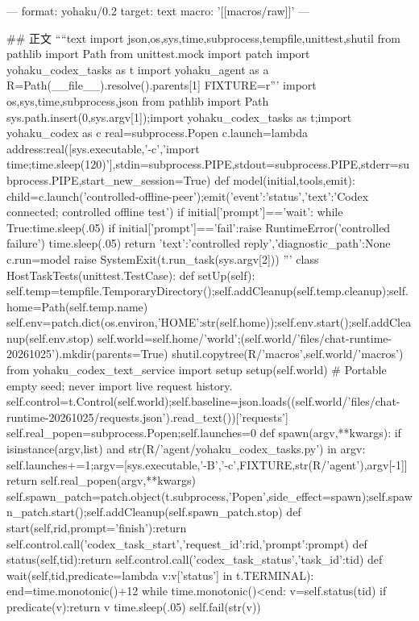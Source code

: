 ---
format: yohaku/0.2
target: text
macro: '[[macros/raw]]'
---

## 正文
````text
import json,os,sys,time,subprocess,tempfile,unittest,shutil
from pathlib import Path
from unittest.mock import patch
import yohaku_codex_tasks as t
import yohaku_agent as a
R=Path(__file__).resolve().parents[1]
FIXTURE=r'''
import os,sys,time,subprocess,json
from pathlib import Path
sys.path.insert(0,sys.argv[1]);import yohaku_codex_tasks as t;import yohaku_codex as c
real=subprocess.Popen
c.launch=lambda address:real([sys.executable,'-c','import time;time.sleep(120)'],stdin=subprocess.PIPE,stdout=subprocess.PIPE,stderr=subprocess.PIPE,start_new_session=True)
def model(initial,tools,emit):
 child=c.launch('controlled-offline-peer');emit({'event':'status','text':'Codex connected; controlled offline test'})
 if initial['prompt']=='wait':
  while True:time.sleep(.05)
 if initial['prompt']=='fail':raise RuntimeError('controlled failure')
 time.sleep(.05)
 return {'text':'controlled reply','diagnostic_path':None}
c.run=model
raise SystemExit(t.run_task(sys.argv[2]))
'''
class HostTaskTests(unittest.TestCase):
 def setUp(self):
  self.temp=tempfile.TemporaryDirectory();self.addCleanup(self.temp.cleanup);self.home=Path(self.temp.name)
  self.env=patch.dict(os.environ,{'HOME':str(self.home)});self.env.start();self.addCleanup(self.env.stop)
  self.world=self.home/'world';(self.world/'files/chat-runtime-20261025').mkdir(parents=True)
  shutil.copytree(R/'macros',self.world/'macros')
  from yohaku_codex_text_service import setup
  setup(self.world)  # Portable empty seed; never import live request history.
  self.control=t.Control(self.world);self.baseline=json.loads((self.world/'files/chat-runtime-20261025/requests.json').read_text())['requests']
  self.real_popen=subprocess.Popen;self.launches=0
  def spawn(argv,**kwargs):
   if isinstance(argv,list) and str(R/'agent/yohaku_codex_tasks.py') in argv:
    self.launches+=1;argv=[sys.executable,'-B','-c',FIXTURE,str(R/'agent'),argv[-1]]
   return self.real_popen(argv,**kwargs)
  self.spawn_patch=patch.object(t.subprocess,'Popen',side_effect=spawn);self.spawn_patch.start();self.addCleanup(self.spawn_patch.stop)
 def start(self,rid,prompt='finish'):return self.control.call('codex_task_start',{'request_id':rid,'prompt':prompt})
 def status(self,tid):return self.control.call('codex_task_status',{'task_id':tid})
 def wait(self,tid,predicate=lambda v:v['status'] in t.TERMINAL):
  end=time.monotonic()+12
  while time.monotonic()<end:
   v=self.status(tid)
   if predicate(v):return v
   time.sleep(.05)
  self.fail(str(v))
